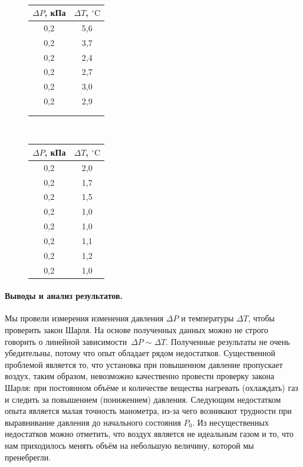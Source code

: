 \documentclass{article}
\begin{document}
\begin{figure}[htb]
\begin{minipage}[]{0.45\linewidth}
	\\
	\begin{tabular}{c|c}
	$\Delta P$, кПа&$\Delta T$, $^\circ\mbox{C}$\\
	\hline
	0,2&5,6 \\
	0,2&3,7  \\
	0,2&2,4 \\
	0,2&2,7 \\
	0,2&3,0 \\
	0,2&2,9 \\
	&\\
	&
\end{tabular}
\end{minipage}
\hfill
\begin{minipage}{0.45\linewidth}
	\\
\begin{tabular}{c|c}
	$\Delta P$, кПа&$\Delta T$, $^\circ\mbox{C}$\\
	\hline
	0,2&2,0 \\
	0,2&1,7  \\
	0,2&1,5  \\
	0,2&1,0  \\
	0,2&1,0 \\
	0,2&1,1 \\
	0,2& 1,2 \\
	0,2& 1,0 \\
\end{tabular}
\end{minipage}
\end{figure}
\paragraph{Выводы и анализ результатов.}
Мы провели измерения изменения давления $\Delta P$ и температуры $\Delta T$, чтобы проверить закон Шарля. На основе полученных данных можно не строго говорить о линейной зависимости~$\Delta P \sim \Delta T$. Полученные результаты не очень убедительны, потому что опыт обладает рядом недостатков. Существенной проблемой является то, что установка при повышенном давление пропускает воздух, таким образом, невозможно качественно провести проверку закона Шарля: при постоянном объёме и количестве вещества нагревать (охлаждать) газ и следить за повышением (понижением) давления. Следующим недостатком опыта является малая точность манометра, из-за чего возникают трудности при выравнивание давления до начального состояния $P_0$. Из несущественных недостатков можно отметить, что воздух является не идеальным газом и то, что нам приходилось менять объём на небольшую величину, которой мы пренебрегли.
\end{document}
